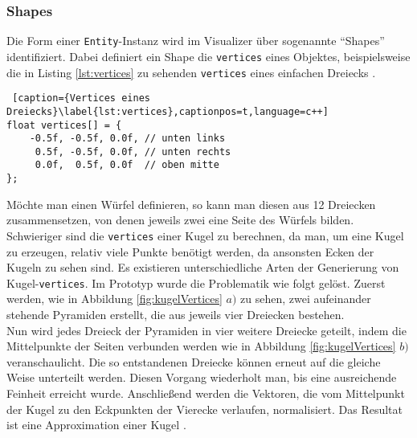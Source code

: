 \documentclass[11pt,a4paper]{article}
\begin{document}
\newpage
\subsubsection{Shapes}
Die Form einer \lstinline!Entity!-Instanz wird im Visualizer über sogenannte ``Shapes'' identifiziert. Dabei definiert ein Shape die \lstinline!vertices! eines Objektes, beispielsweise die in Listing \ref{lst:vertices} zu sehenden \lstinline!vertices! eines einfachen Dreiecks \cite[Hello Triangle]{LearnOpenGL}.

\begin{lstlisting} [caption={Vertices eines Dreiecks}\label{lst:vertices},captionpos=t,language=c++]
float vertices[] = {
    -0.5f, -0.5f, 0.0f, // unten links
     0.5f, -0.5f, 0.0f, // unten rechts
     0.0f,  0.5f, 0.0f  // oben mitte
};
\end{lstlisting}
\noindent
Möchte man einen Würfel definieren, so kann man diesen aus 12 Dreiecken zusammensetzen, von denen jeweils zwei eine Seite des Würfels bilden.\\
Schwieriger sind die  \lstinline!vertices! einer Kugel zu berechnen, da man, um eine Kugel zu erzeugen, relativ viele  Punkte benötigt werden, da ansonsten Ecken der Kugeln zu sehen sind. Es existieren unterschiedliche Arten der Generierung von Kugel-\lstinline!vertices!. Im Prototyp wurde die Problematik wie folgt gelöst. Zuerst werden, wie in Abbildung \ref{fig:kugelVertices} $a)$ zu sehen, zwei aufeinander stehende Pyramiden erstellt, die aus jeweils vier Dreiecken bestehen.\\
Nun wird jedes Dreieck der Pyramiden in vier weitere Dreiecke geteilt, indem die Mittelpunkte der Seiten verbunden werden wie in Abbildung \ref{fig:kugelVertices} $b)$ veranschaulicht. Die so entstandenen Dreiecke können erneut auf die gleiche Weise unterteilt werden. Diesen Vorgang wiederholt man, bis eine ausreichende Feinheit erreicht wurde. Anschließend werden die Vektoren, die vom Mittelpunkt der Kugel zu den Eckpunkten der Vierecke verlaufen, normalisiert. Das Resultat ist eine Approximation einer Kugel \cite{sphereGeneration}.
\end{document}
